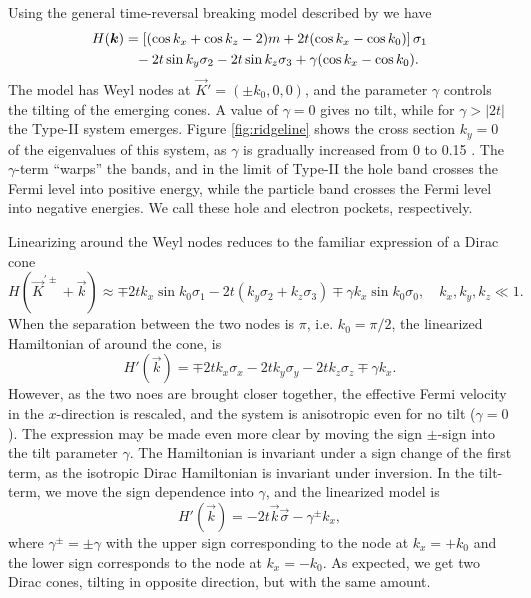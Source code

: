 Using the general time-reversal breaking model described by \citeauthor{mccormickMinimalModelsTopological2017} we have
\begin{equation}
  \begin{split}
    H(\vec{k}) &= \left[ ( \cos k_x + \cos k_z - 2 )m + 2 t (\cos k_x - \cos k_0) \right] \sigma_1\\
    &\pe - 2 t \sin k_y \sigma_2 - 2t \sin k_z \sigma_3
    + \gamma (\cos k_x - \cos k_0).
  \end{split}
\end{equation}
The model has Weyl nodes at \(\vec{K}' = (\pm k_{0}, 0,0)\), and the parameter $\gamma$ controls the tilting of the emerging cones.
A value of $\gamma=0$ gives no tilt, while for $\gamma > |2 t|$ the Type-II system emerges.
Figure \ref{fig:ridgeline} shows the cross section \(k_{y} = 0\) of the eigenvalues of this system, as \(\gamma\) is gradually increased from 0 to 0.15 .
The \(\gamma\)-term ``warps'' the bands, and in the limit of Type-II the hole band crosses the Fermi level into positive energy, while the particle band crosses the Fermi level into negative energies.
We call these hole and electron pockets, respectively.

Linearizing around the Weyl nodes reduces to the familiar expression of a Dirac cone
\begin{equation}
  \label{eq:1}
  H(\vec{K} ^{'\pm} + \vec{k}) \approx \mp 2 t k_{x} \sin k_{0} \sigma_{1} - 2 t (k_{y} \sigma_{2} + k_{z} \sigma_{3}) \mp \gamma k_{x} \sin k_{0} \sigma_{0}, \quad k_{x}, k_{y}, k_{z} \ll 1.
\end{equation}
When the separation between the two nodes is \(\pi\), i.e. \(k_{0} = \pi/ 2 \), the linearized Hamiltonian of around the cone, is
\begin{equation}
  \label{eq:2}
  H'(\vec{k}) = \mp 2 t k_{x} \sigma_{x} - 2t k_{y} \sigma_{y} - 2 t k_{z} \sigma_{z} \mp \gamma k_{x}.
\end{equation}
However, as the two noes are brought closer together, the effective Fermi velocity in the \(x\)-direction is rescaled, and the system is anisotropic even for no tilt (\(\gamma=0\)).
The expression may be made even more clear by moving the sign \(\pm\)-sign into the tilt parameter \(\gamma\).
The Hamiltonian is invariant under a sign change of the first term, as the isotropic Dirac Hamiltonian is invariant under inversion.
In the tilt-term, we move the sign dependence into \(\gamma \), and the linearized model is
\begin{equation}
  \label{eq:3}
  H'(\vec{k}) = - 2t \vec{k} \vec{\sigma} - \gamma^{\pm} k_{x},
\end{equation}
where \(\gamma ^{\pm} = \pm \gamma \) with the upper sign corresponding to the node at \(k_{x} = + k_{0}\) and the lower sign corresponds to the node at \(k_{x} = - k_{0}\).
As expected, we get two Dirac cones, tilting in opposite direction, but with the same amount.

